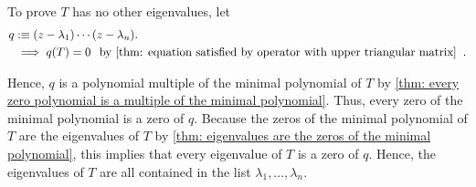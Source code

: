 \begin{prf}
  To prove $T$ has no other eigenvalues, let
  \begin{equation}
    \begin{aligned}
      q &:\equiv (z-\lambda_1) \cdots (z-\lambda_n). \\
      &\implies q(T) = 0 \;\;\, \text{by \ref{thm: equation satisfied by operator with upper triangular matrix}}\;\;.
    \end{aligned}
  \end{equation}

  Hence, $q$ is a polynomial multiple of the minimal polynomial of $T$ by \ref{thm: every zero polynomial is a multiple of the minimal polynomial}. Thus, every zero of the minimal polynomial is a zero of $q$.
  Because the zeros of the minimal polynomial of $T$ are the eigenvalues of $T$ by \ref{thm: eigenvalues are the zeros of the minimal polynomial}, this implies that every eigenvalue of $T$ is a zero of $q$. Hence, the eigenvalues of $T$ are all contained in the list $\lambda_1, \ldots, \lambda_n$.
\end{prf}


